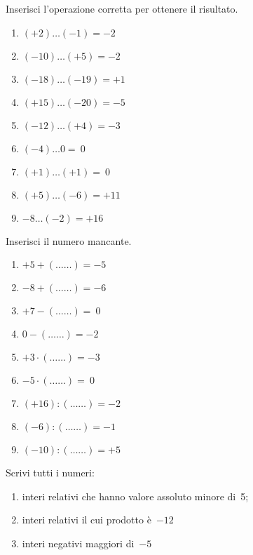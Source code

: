 \begin{esercizio}
Inserisci l'operazione corretta per ottenere il risultato.

\vspace{-.5em}
 \begin{multicols}{3}
 \begin{enumerate}[noitemsep, label=(\alph*)]
 \item \((+2)\ldots(-1) = -2\)
 \item \((-10)\ldots(+5) = -2\)
 \item \((-18)\ldots(-19) = +1\)
 \item \((+15)\ldots(-20) = -5\)
 \item \((-12)\ldots(+4) = -3\)
 \item \((-4)\ldots0 =~0\)
 \item \((+1)\ldots(+1) =~0\)
 \item \((+5)\ldots(-6) = +11\)
 \item \(-8\ldots(-2) = +16\)
 \end{enumerate}
 \end{multicols}
\end{esercizio}


\begin{esercizio}
Inserisci il numero mancante.

\vspace{-.5em}
 \begin{multicols}{3}
 \begin{enumerate}[noitemsep, label=(\alph*)]
 \item \(+5 + (\ldots\ldots) = -5\)
 \item \(-8 + (\ldots\ldots) = -6\)
 \item \(+7 - (\ldots\ldots) =~0\)
 \item \(0 - (\ldots\ldots) = -2\)
 \item \(+3\cdot (\ldots\ldots) = -3\)
 \item \(-5\cdot (\ldots\ldots) =~0\)
 \item \((+16): (\ldots\ldots) = -2\)
 \item \((-6): (\ldots\ldots) = -1\)
 \item \((-10): (\ldots\ldots) = +5\)
 \end{enumerate}
 \end{multicols}
\end{esercizio}

\begin{esercizio}
 Scrivi tutti i numeri:
 \begin{enumerate}[noitemsep, label=(\alph*)]
 \item interi relativi che hanno valore assoluto minore di~5;
 \item interi relativi il cui prodotto è~\(-12\)
 \item interi negativi maggiori di~\(-5\)
 \end{enumerate}
\end{esercizio}

